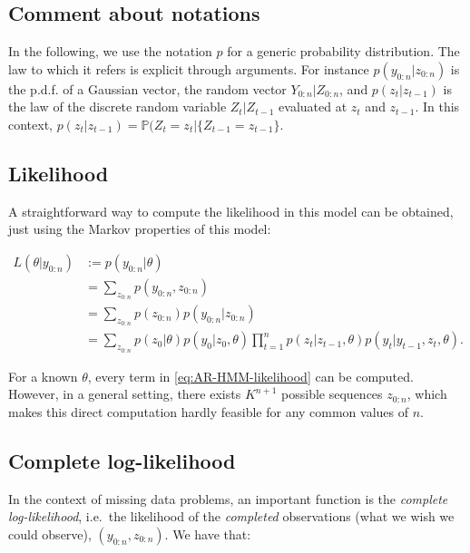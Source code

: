 \documentclass[]{book}
\begin{document}
\subsection*{Comment about notations}\label{comment-about-notations}

In the following, we use the notation \(p\) for a generic probability
distribution. The law to which it refers is explicit through arguments.
For instance \(p(y_{0:n} \vert z_{0:n})\) is the p.d.f. of a Gaussian
vector, the random vector \(Y_{0:n}\vert Z_{0:n}\), and
\(p(z_t\vert z_{t - 1})\) is the law of the discrete random variable
\(Z_{t} \vert Z_{t - 1}\) evaluated at \(z_t\) and \(z_{t -1}\). In this
context,
\(p(z_t\vert z_{t - 1}) = \mathbb{P}(Z_t = z_t \vert \lbrace Z_{t-1} = z_{t -1}\rbrace.\)

\subsection{Likelihood}\label{likelihood}

A straightforward way to compute the likelihood in this model can be
obtained, just using the Markov properties of this model:

\begin{align}
L(\theta \vert y_{0:n}) &:= p(y_{0:n} \vert \theta) \nonumber \\
&= \sum_{z_{0:n}} p(y_{0:n}, z_{0:n}) \nonumber \\
&= \sum_{z_{0:n}} p(z_{0:n})p(y_{0:n}\vert z_{0:n}) \nonumber \\
&=  \sum_{z_{0:n}} p(z_0 \vert \theta) p(y_0\vert z_0, \theta) \prod_{t = 1}^n p(z_{t} \vert z_{t - 1}, \theta)p(y_{t}\vert y_{t -1}, z_{t}, \theta)  \label{eq:AR-HMM-likelihood}.
\end{align}

For a known \(\theta\), every term in \eqref{eq:AR-HMM-likelihood} can be
computed. However, in a general setting, there exists \(K^{n + 1}\)
possible sequences \(z_{0:n}\), which makes this direct computation
hardly feasible for any common values of \(n\).

\subsection{Complete log-likelihood}\label{complete-log-likelihood}

In the context of missing data problems, an important function is the
\emph{complete log-likelihood}, i.e.~the likelihood of the
\emph{completed} observations (what we wish we could observe),
\((y_{0:n}, z_{0:n})\). We have that:
\end{document}
